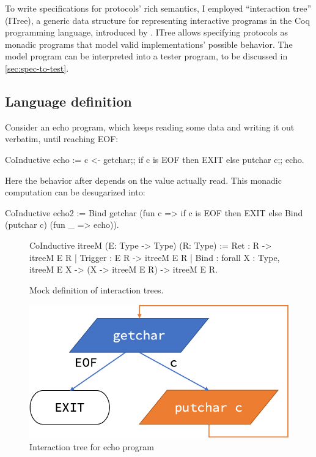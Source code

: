 To write specifications for protocols' rich semantics, I employed ``interaction
tree'' (ITree), a generic data structure for representing interactive programs
in the Coq programming language, introduced by \textcite{itree}.  ITree allows
specifying protocols as monadic programs that model valid implementations'
possible behavior.  The model program can be interpreted into a tester program,
to be discussed in \autoref{sec:spec-to-test}.

\subsection{Language definition}
\label{sec:itree-lang}
Consider an echo program, which keeps reading some data and writing it out
verbatim, until reaching EOF:
\begin{coq}
  CoInductive echo := c <- getchar;;
                      if c is EOF then EXIT
                      else putchar c;; echo.
\end{coq}

Here the behavior after  depends on the value actually read.  This
monadic computation can be desugarized into:
\begin{coq}
  CoInductive echo2 :=
    Bind getchar (fun c => if c is EOF then EXIT
                         else Bind (putchar c) (fun _ => echo)).
\end{coq}

\begin{figure}
\begin{coq}
  CoInductive itreeM (E: Type -> Type) (R: Type) :=
    Ret     : R   -> itreeM E R
  | Trigger : E R -> itreeM E R
  | Bind    : forall {X : Type}, itreeM E X -> (X -> itreeM E R) -> itreeM E R.
\end{coq}
\caption{Mock definition of interaction trees.}
\label{fig:mock-itree}
\end{figure}

\begin{figure}
  \includegraphics[width=.5\linewidth]{figures/echo-itree}
  \caption{Interaction tree for echo program}
  \label{fig:echo-itree}
\end{figure}

